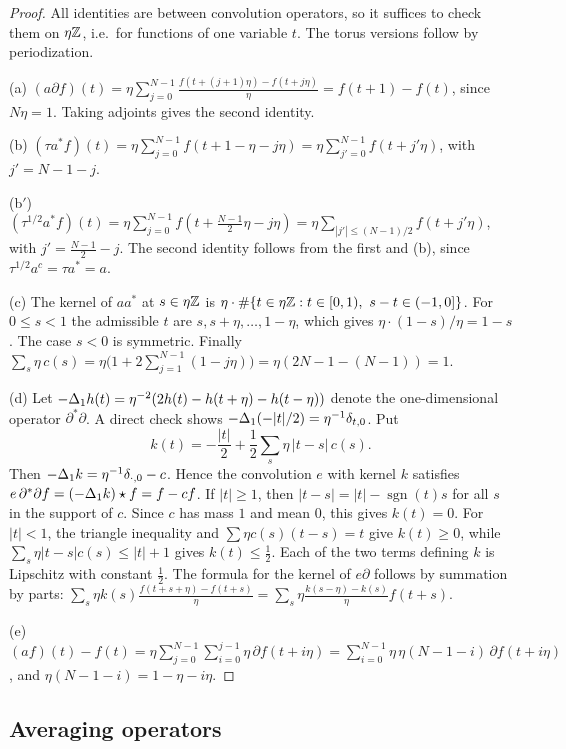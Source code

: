 \begin{proof}
All identities are between convolution operators, so it suffices to check them on $\eta\mathbb Z$, i.e.\ for functions of one variable $t$. The torus versions follow by periodization.

(a) $(a\partial f)(t)=\eta\sum_{j=0}^{N-1}\frac{f(t+(j+1)\eta)-f(t+j\eta)}{\eta}=f(t+1)-f(t)$, since $N\eta=1$. Taking adjoints gives the second identity.

(b) $(\tau a^*f)(t)=\eta\sum_{j=0}^{N-1}f(t+1-\eta-j\eta)=\eta\sum_{j'=0}^{N-1}f(t+j'\eta)$, with $j'=N-1-j$.

(b$'$) $(\tau^{1/2}a^*f)(t)=\eta\sum_{j=0}^{N-1}f(t+\frac{N-1}2\eta-j\eta)=\eta\sum_{|j'|\le(N-1)/2}f(t+j'\eta)$, with $j'=\frac{N-1}2-j$. The second identity follows from the first and (b), since $\tau^{1/2}a^c=\tau a^*=a$.

(c) The kernel of $aa^*$ at $s\in\eta\mathbb Z$ is $\eta\cdot\#\{t\in\eta\Z: t\in[0,1),\ s-t\in(-1,0]\}$. For $0\le s<1$ the admissible $t$ are $s,s+\eta,\dots,1-\eta$, which gives $\eta\cdot(1-s)/\eta=1-s$. The case $s<0$ is symmetric. Finally $\sum_s\eta\,c(s)=\eta\big(1+2\sum_{j=1}^{N-1}(1-j\eta)\big)=\eta(2N-1-(N-1))=1$.

(d) Let $-\Delta_1h(t)=\eta^{-2}(2h(t)-h(t+\eta)-h(t-\eta))$ denote the one-dimensional operator $\partial^*\partial$. A direct check shows $-\Delta_1(-|t|/2)=\eta^{-1}\delta_{t,0}$. Put
\[
k(t)=-\frac{|t|}2+\frac12\sum_s\eta\,|t-s|\,c(s).
\]
Then $-\Delta_1k=\eta^{-1}\delta_{\cdot,0}-c$. Hence the convolution $e$ with kernel $k$ satisfies $e\,\partial^*\partial f=(-\Delta_1k)\star f=f-cf$. If $|t|\ge1$, then $|t-s|=|t|-\operatorname{sgn}(t)s$ for all $s$ in the support of $c$. Since $c$ has mass $1$ and mean $0$, this gives $k(t)=0$. For $|t|<1$, the triangle inequality and $\sum\eta c(s)(t-s)=t$ give $k(t)\ge0$, while $\sum_s\eta|t-s|c(s)\le|t|+1$ gives $k(t)\le\frac12$. Each of the two terms defining $k$ is Lipschitz with constant $\frac12$. The formula for the kernel of $e\partial$ follows by summation by parts: $\sum_s\eta k(s)\frac{f(t+s+\eta)-f(t+s)}\eta=\sum_s\eta\frac{k(s-\eta)-k(s)}\eta f(t+s)$.

(e) $(a f)(t)-f(t)=\eta\sum_{j=0}^{N-1}\sum_{i=0}^{j-1}\eta\,\partial f(t+i\eta)=\sum_{i=0}^{N-1}\eta\,\eta(N-1-i)\,\partial f(t+i\eta)$, and $\eta(N-1-i)=1-\eta-i\eta$.
\end{proof}

\subsection{Averaging operators}\label{ss:2.4}

